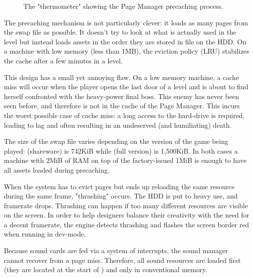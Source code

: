 \documentclass[book.tex]{subfiles}
\begin{document}
 \par
\begin{figure}[H]
\centering
 \caption{The "thermometer" showing the Page Manager precaching process.}
 \end{figure}
 \par
The precaching mechanism is not particularly clever: it loads as many pages from the swap file as possible. It doesn't try to look at what is actually used in the level but instead loads assets in the order they are stored in  file on the HDD. On a machine with low memory (less than 1MB), the eviction policy (LRU) stabilizes the cache after a few minutes in a level.\\
\par
This design has a small yet annoying flaw. On a low memory machine, a cache miss will occur when the player opens the last door of a level and is about to find herself confronted with the heavy-power final boss. This enemy has never been seen before, and therefore is not in the cache of the Page Manager. This incurs the worst possible case of cache miss: a long access to the hard-drive is required, leading to lag and often resulting in an undeserved (and humiliating) death.\\
\par
The size of the swap file varies depending on the version of the game being played:  (shareware) is 742KiB while  (full version) is 1,500KiB. In both cases a machine with 2MiB of RAM on top of the factory-issued 1MiB is enough to have all assets loaded during precaching.\\
\par
{} When the system has to evict pages but ends up reloading the same resource during the same frame, "thrashing" occurs. The HDD is put to heavy use, and framerate drops. Thrashing can happen if too many different resources are visible on the screen. In order to help designers balance their creativity with the need for a decent framerate, the engine detects thrashing and flashes the screen border red when running in dev-mode.\\
\par
{} Because sound cards are fed via a system of interrupts, the sound manager cannot recover from a page miss. Therefore, all sound resources are loaded first (they are located at the start of ) and only in conventional memory.
\end{document}
